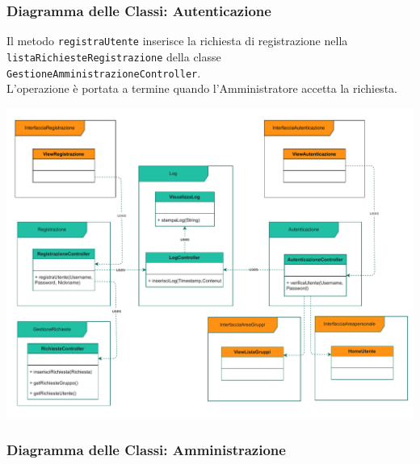 \subsubsection*{Diagramma delle Classi: Autenticazione}
\vspace{1cm}
Il metodo \verb|registraUtente| inserisce la richiesta di registrazione nella \\\verb|listaRichiesteRegistrazione| della classe \verb|GestioneAmministrazioneController|.\\
L'operazione è portata a termine quando l'Amministratore accetta la richiesta.
\vspace{2cm}
\begin{adjustwidth}{-2.5cm}{0cm}
\includegraphics[scale=0.7]{classi/Package-Classi-Autenticazione.drawio.pdf}
\end{adjustwidth}



\subsubsection*{Diagramma delle Classi: Amministrazione}
\vspace{0.5cm}

